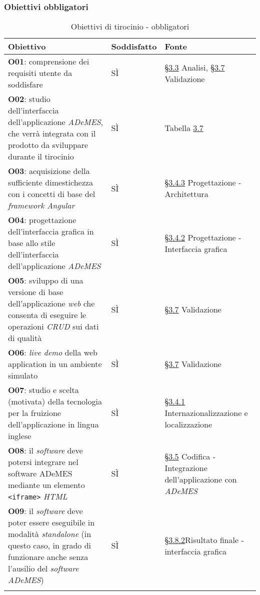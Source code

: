 \subsubsection*{Obiettivi obbligatori}
\begin{longtable}{>{\centering\arraybackslash}m{}>{\centering\arraybackslash}m{}>{\centering\arraybackslash}m{}}
    \hline
    \rowcolor{black}
    \color{white}\textbf{Obiettivo} & \color{white}\textbf{Soddisfatto} & \color{white}\textbf{Fonte} \\
    \hline
    \endhead %
    \textbf{O01}: comprensione dei requisiti utente da soddisfare & SÌ & \hyperref[sec:analisi]{§3.3} Analisi, \hyperref[sec:validazione]{§3.7} Validazione \\
    \hline
    \textbf{O02}: studio dell’interfaccia dell’applicazione \textit{ADeMES}, che verrà integrata con il prodotto da sviluppare durante il tirocinio & SÌ & Tabella \hyperref[tab:colors]{3.7} \\
    \hline
    \textbf{O03}: acquisizione della sufficiente dimestichezza con i concetti di base del \textit{framework Angular} & SÌ & \hyperref[subsec:architettura]{§3.4.3} Progettazione - Architettura \\
    \hline
    \textbf{O04}: progettazione dell'interfaccia grafica in base allo stile dell'interfaccia dell'applicazione \textit{ADeMES} & SÌ & \hyperref[subsec:interfaccia]{§3.4.2} Progettazione - Interfaccia grafica  \\
    \hline
    \textbf{O05}: sviluppo di una versione di base dell'applicazione \textit{web} che consenta di eseguire le operazioni \textit{CRUD} sui dati di qualità & SÌ & \hyperref[sec:validazione]{§3.7} Validazione \\
    \hline
    \textbf{O06}: \textit{live demo} della web application in un ambiente simulato & SÌ & \hyperref[sec:validazione]{§3.7} Validazione \\
    \hline
    \textbf{O07}: studio e scelta (motivata) della tecnologia per la fruizione dell'applicazione in lingua inglese & SÌ & \hyperref[subsec:internazionalizzazione]{§3.4.1} Internazionalizzazione e localizzazione \\
    \hline
    \textbf{O08}: il \textit{software} deve potersi integrare nel software ADeMES mediante un elemento \texttt{<iframe>} \textit{HTML} & SÌ & \hyperref[subsec:integrazione]{§3.5} Codifica - Integrazione dell'applicazione con \textit{ADeMES}\\
    \hline
    \textbf{O09}: il \textit{software} deve poter essere eseguibile in modalità \textit{standalone} (in questo caso, in grado di funzionare anche senza l'ausilio del \textit{software ADeMES}) & SÌ & \hyperref[subsec:interfaccia-risultato]{§3.8.2}Risultato finale - interfaccia grafica \\
    \hline
    \caption{Obiettivi di tirocinio - obbligatori}
\end{longtable}


